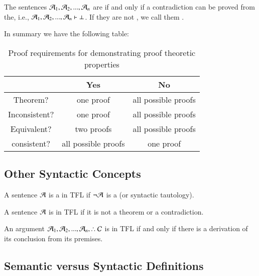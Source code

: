 \begin{definition}
    The sentences $\mathcal{A}_1,\mathcal{A}_2,...,\mathcal{A}_n$ are  if and only if a contradiction can be proved from the, i.e., $\mathcal{A}_1,\mathcal{A}_2,...,\mathcal{A}_n\vdash\bot$. If they are not , we call them .
\end{definition}


In summary we have the following table:

\begin{table}[H]
    \centering
    \caption{Proof requirements for demonstrating proof theoretic properties}
    \begin{tabular}{c|cc}
        & \textbf{Yes} & \textbf{No} \\ \hline
        Theorem? & one proof & all possible proofs \\
        Inconsistent? & one proof & all possible proofs \\
        Equivalent? & two proofs & all possible proofs \\
        consistent? & all possible proofs & one proof 
    \end{tabular}
\end{table}


\subsection{ Other Syntactic Concepts}

\begin{definition}
    A sentence $\mathcal{A}$ is a  in TFL if $\neg\mathcal{A}$ is a  (or syntactic tautology).
\end{definition}

\begin{definition}
    A sentence $\mathcal{A}$ is  in TFL if it is not a theorem or a contradiction.
\end{definition}

\begin{definition}
    An argument $\metav{A}_1,\metav{A}_2,...,\metav{A}_n,\therefore \metav{C}$ is  in TFL if and only if there is a derivation of its conclusion from its premises.
\end{definition}

\subsection{ Semantic versus Syntactic Definitions}

